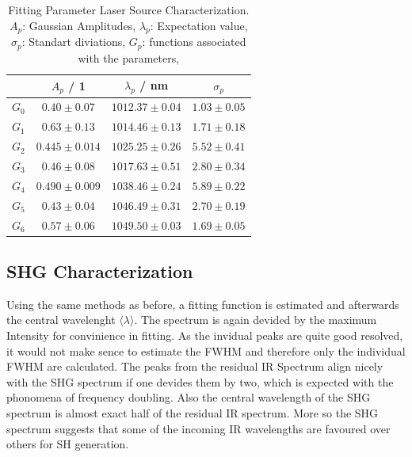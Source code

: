 \begin{table}[H]
\centering
\caption{
    Fitting Parameter Laser Source Characterization. \\
    $A_p$: Gaussian Amplitudes,
    $\lambda_p$: Expectation value,
    $\sigma_p$: Standart diviations,
    $G_p$: functions associated with the parameters,
}
\begin{tabular}{c|ccc} \hline
    &  $A_p$ / 1 &  $\lambda_p$ / nm & $\sigma_p$ \\ \hline  \hline 
$G_0$&$0.40 \pm 0.07$&$1012.37 \pm 0.04$&$1.03 \pm 0.05$\\ \hline
$G_1$&$0.63 \pm 0.13$&$1014.46 \pm 0.13$&$1.71 \pm 0.18$\\ \hline
$G_2$&$0.445 \pm 0.014$&$1025.25 \pm 0.26$&$5.52 \pm 0.41$\\ \hline
$G_3$&$0.46 \pm 0.08$&$1017.63 \pm 0.51$&$2.80 \pm 0.34$\\ \hline
$G_4$&$0.490 \pm 0.009$&$1038.46 \pm 0.24$&$5.89 \pm 0.22$\\ \hline
$G_5$&$0.43 \pm 0.04$&$1046.49 \pm 0.31$&$2.70 \pm 0.19$\\ \hline
$G_6$&$0.57 \pm 0.06$&$1049.50 \pm 0.03$&$1.69 \pm 0.05$\\ \hline
\end{tabular}
\label{tab:evaluation:ir_fitted1}
\end{table}
\newpage
\subsection{SHG Characterization}
Using the same methods as before, a fitting function is estimated and afterwards the central wavelenght $\langle \lambda \rangle$.
The spectrum is again devided by the maximum Intensity for convinience in fitting.
As the invidual peaks are quite good resolved, it would not make sence to estimate the FWHM and therefore only the individual FWHM are calculated.
The peaks from the residual IR Spectrum align nicely with the SHG spectrum if one devides them by two, which is expected with the phonomena of frequency doubling.
Also the central wavelength of the SHG spectrum is almost exact half of the residual IR spectrum.
More so the SHG spectrum suggests that some of the incoming IR wavelengths are favoured over others for SH generation.

